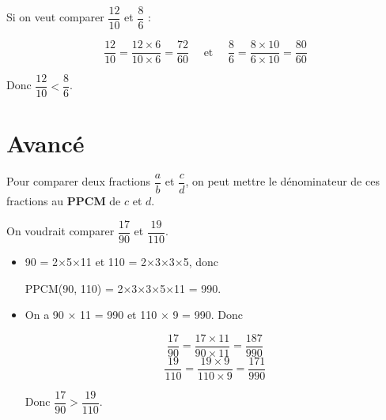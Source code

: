\documentclass[a4paper,11pt]{article}
\begin{document}
\begin{exemple}
	Si on veut comparer $\dfrac{12}{10}$ et $\dfrac{8}{6}$ :

	$$ \dfrac{12}{10} = \dfrac{12 × 6}{10 × 6} = \dfrac{72}{60} \hspace{1em}\text{ et }\hspace{1em} \dfrac{8}{6} = \dfrac{8 × 10}{6 × 10} = \dfrac{80}{60} $$

	Donc $\dfrac{12}{10} < \dfrac{8}{6}$.
\end{exemple}

\newpage

\section*{Avancé}

\begin{methode}
	Pour comparer deux fractions $\dfrac{a}{b}$ et $\dfrac{c}{d}$, on peut mettre le dénominateur de ces fractions au \textbf{PPCM} de $c$ et $d$.
\end{methode}

\begin{exemple}
	On voudrait comparer $\dfrac{17}{90}$ et $\dfrac{19}{110}$.
	\begin{itemize}
		\item 90 = 2×5×11 et 110 = 2×3×3×5, donc

		      PPCM(90, 110) = 2×3×3×5×11 = 990.
		\item On a 90 × 11 = 990 et 110 × 9 = 990. Donc

		      $$ \dfrac{17}{90} = \dfrac{17 × 11}{90 × 11} = \dfrac{187}{990} $$
		      $$ \dfrac{19}{110} = \dfrac{19 × 9}{110 × 9} = \dfrac{171}{990} $$

		      Donc $\dfrac{17}{90} > \dfrac{19}{110}$.
	\end{itemize}
\end{exemple}
\end{document}
